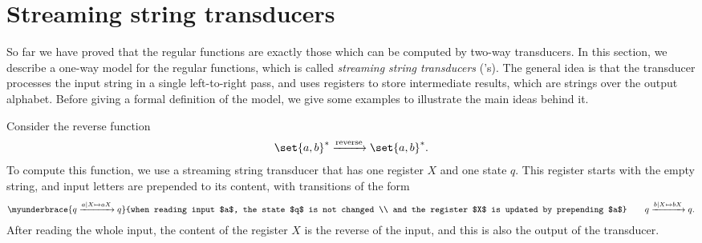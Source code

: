 \section{Streaming string transducers}
\label{sec:sst}
So far we have proved that the regular functions are exactly those which can be computed by two-way transducers. In this section, we describe a one-way model for the regular functions, which is called \emph{streaming string transducers} (\sst's).  The general idea is that the transducer processes the input string in a single left-to-right pass, and uses registers to store intermediate results, which are strings over the output alphabet. Before giving a formal definition of the model, we give some examples to illustrate the main ideas behind it.

\begin{myexample}[Reverse]
    \label{example:reverse-function-sst}
    Consider the reverse function 
    \begin{align*}
    \set{a,b}^* 
    \xrightarrow {\text{reverse}}
    \set{a,b}^*.
    \end{align*}
    To compute this function, we use a streaming string transducer that has one register $X$ and one state $q$. This register starts with the empty string, and input letters are prepended to its content, with transitions of the form
    \begin{align*}
      \myunderbrace{q
        \xrightarrow {a \mid X \mapsto aX}
        q}{when reading input $a$, the state $q$ is not changed \\ and the register $X$ is updated by prepending $a$} \qquad
        q   
        \xrightarrow {b \mid X \mapsto bX}
        q.
    \end{align*}
    After reading the whole input, the content of the register $X$ is the reverse of the input, and this is also the output of the transducer.
\end{myexample}

